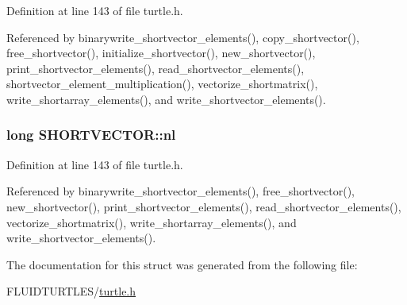 Definition at line 143 of file turtle.\-h.



Referenced by binarywrite\-\_\-shortvector\-\_\-elements(), copy\-\_\-shortvector(), free\-\_\-shortvector(), initialize\-\_\-shortvector(), new\-\_\-shortvector(), print\-\_\-shortvector\-\_\-elements(), read\-\_\-shortvector\-\_\-elements(), shortvector\-\_\-element\-\_\-multiplication(), vectorize\-\_\-shortmatrix(), write\-\_\-shortarray\-\_\-elements(), and write\-\_\-shortvector\-\_\-elements().

\hypertarget{struct_s_h_o_r_t_v_e_c_t_o_r_adce8059e01116052c25714f551b7e2c2}{
\subsubsection[{nl}]{\setlength{\rightskip}{0pt plus 5cm}long S\-H\-O\-R\-T\-V\-E\-C\-T\-O\-R\-::nl}}\label{struct_s_h_o_r_t_v_e_c_t_o_r_adce8059e01116052c25714f551b7e2c2}


Definition at line 143 of file turtle.\-h.



Referenced by binarywrite\-\_\-shortvector\-\_\-elements(), free\-\_\-shortvector(), new\-\_\-shortvector(), print\-\_\-shortvector\-\_\-elements(), read\-\_\-shortvector\-\_\-elements(), vectorize\-\_\-shortmatrix(), write\-\_\-shortarray\-\_\-elements(), and write\-\_\-shortvector\-\_\-elements().



The documentation for this struct was generated from the following file\-:\begin{DoxyCompactItemize}
\item 
F\-L\-U\-I\-D\-T\-U\-R\-T\-L\-E\-S/\hyperlink{turtle_8h}{turtle.\-h}\end{DoxyCompactItemize}
